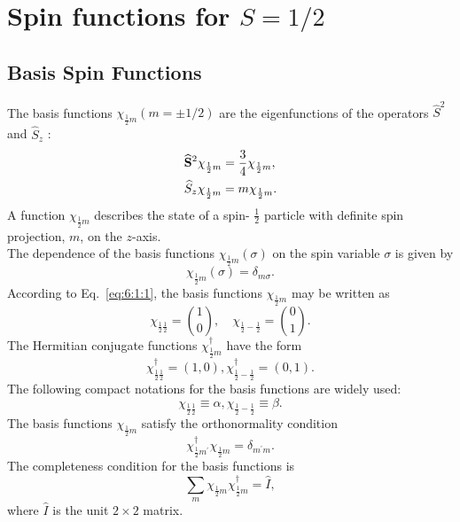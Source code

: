 \section{Spin functions for $S=1 / 2$}\label{sec:6.2}
\subsection{Basis Spin Functions}\label{sec:6.2.1}
The basis functions $\chi_{\frac{1}{2} m}(m= \pm 1 / 2)$ are the eigenfunctions of the operators $\widehat{S}^{2}$ and $\widehat{S}_{z}$ :
\begin{align}
& \widehat{\mathbf{S}}^{2} \chi_{\frac{1}{2} m}=\frac{3}{4} \chi_{\frac{1}{2} m} , \label{eq:6:2:1}\\
& \widehat{S}_{z} \chi_{\frac{1}{2} m}=m \chi_{\frac{1}{2} m} . \notag
\end{align}
A function $\chi_{\frac{1}{2} m}$ describes the state of a spin- $\frac{1}{2}$ particle with definite spin projection, $m$, on the $z$-axis.\\
The dependence of the basis functions $\chi_{\frac{1}{2} m}(\sigma)$ on the spin variable $\sigma$ is given by
\begin{equation}
\chi_{\frac{1}{2} m}(\sigma)=\delta_{m \sigma}. \label{eq:6:2:2}
\end{equation}
According to Eq.~\eqref{eq:6:1:1}, the basis functions $\chi_{\frac{1}{2} m}$ may be written as
\begin{equation}
\chi_{\frac{1}{2} \frac{1}{2}}=\binom{1}{0},\quad \chi_{\frac{1}{2}-\frac{1}{2}}=\binom{0}{1} . \label{eq:6:2:3}
\end{equation}
The Hermitian conjugate functions $\chi_{\frac{1}{2} m}^{\dagger}$ have the form
\begin{equation}
\chi_{\frac{1}{2} \frac{1}{2}}^{\dagger}=(1,0), \chi_{\frac{1}{2}-\frac{1}{2}}^{\dagger}=(0,1) . \label{eq:6:2:4}
\end{equation}
The following compact notations for the basis functions are widely used:
\begin{equation}
\chi_{\frac{1}{2} \frac{1}{2}} \equiv \alpha, \chi_{\frac{1}{2}-\frac{1}{2}} \equiv \beta . \label{eq:6:2:5}
\end{equation}
The basis functions $\chi_{\frac{1}{2} m}$ satisfy the orthonormality condition
\begin{equation}
\chi_{\frac{1}{2} m^{\prime}}^{\dagger} \chi_{\frac{1}{2} m}=\delta_{m^{\prime} m} . \label{eq:6:2:6}
\end{equation}
The completeness condition for the basis functions is
\begin{equation}
\sum_{m} \chi_{\frac{1}{2} m} \chi_{\frac{1}{2} m}^{\dagger}=\widehat{I}, \label{eq:6:2:7}
\end{equation}
where $\widehat{I}$ is the unit $2 \times 2$ matrix.

